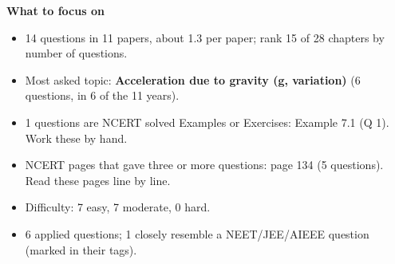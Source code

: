 \begin{minipage}[t]{0.63\linewidth}{\small\textbf{\color{crimson}What to focus on}\par\smallskip
\begin{itemize}[leftmargin=1.1em,itemsep=1pt,topsep=0pt]
\item 14 questions in 11 papers, about 1.3 per paper; rank 15 of 28 chapters by number of questions.
\item Most asked topic: \textbf{Acceleration due to gravity (g, variation)} (6 questions, in 6 of the 11 years).
\item 1 questions are NCERT solved Examples or Exercises: Example 7.1 (Q 1). Work these by hand.
\item NCERT pages that gave three or more questions: page 134 (5 questions). Read these pages line by line.
\item Difficulty: 7 easy, 7 moderate, 0 hard.
\item 6 applied questions; 1 closely resemble a NEET/JEE/AIEEE question (marked in their tags).
\end{itemize}}\end{minipage}\par
{}
